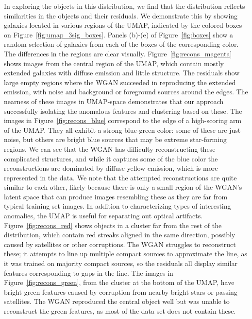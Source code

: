 In exploring the objects in this distribution, we find that the distribution reflects similarities in the objects and their residuals.
We demonstrate this by showing galaxies located in various regions of the UMAP, indicated by the colored boxes on Figure~\ref{fig:umap_3sig_boxes}.
Panels (b)-(e) of Figure~\ref{fig:boxes} show a random selection of galaxies from each of the boxes of the corresponding color.
The differences in the regions are clear visually.
Figure~\ref{fig:recons_magenta} shows images from the central region of the UMAP, which contain mostly extended galaxies with diffuse emission and little structure.
The residuals show large empty regions where the WGAN succeeded in reproducing the extended emission, with noise and background or foreground sources around the edges.
The nearness of these images in UMAP-space demonstrates that our approach successfully isolating the anomalous features and clustering based on these.
The images in Figure~\ref{fig:recons_blue} correspond to the edge of a high-scoring arm of the UMAP.
They all exhibit a strong blue-green color: some of these are just noise, but others are bright blue sources that may be extreme star-forming regions.
We can see that the WGAN has difficulty reconstructing these complicated structures, and while it captures some of the blue color the reconstructions are dominated by diffuse yellow emission, which is more represented in the data.
We note that the attempted reconstructions are quite similar to each other, likely because there is only a small region of the WGAN's latent space that can produce images resembling these as they are far from typical training set images.
In addition to characterizing types of interesting anomalies, the UMAP is useful for separating out optical artifacts.
Figure~\ref{fig:recons_red} shows objects in a cluster far from the rest of the distribution, which contain red streaks aligned in the same direction, possibly caused by satellites or other corruptions.
The WGAN struggles to reconstruct these; it attempts to line up multiple compact sources to approximate the line, as it was trained on majority compact sources, so the residuals all display similar features corresponding to gaps in the line.
The images in Figure~\ref{fig:recons_green}, from the cluster at the bottom of the UMAP, have bright green features caused by corruption from nearby bright stars or passing satellites.
The WGAN reproduced the central object well but was unable to reconstruct the green features, as most of the data set does not contain these.

